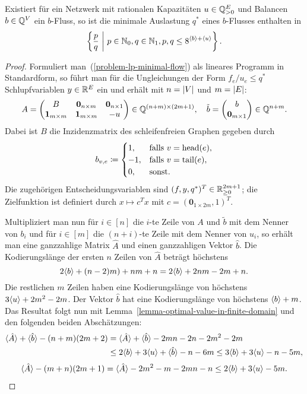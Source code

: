 \begin{corollary}\label{cor-minimal-congestion-limited}
	Existiert für ein Netzwerk mit rationalen Kapazitäten $u\in\mathbb{Q}_{>0}^E$ und Balancen $b\in\mathbb{Q}^V$ ein $b$-Fluss, so ist die minimale Auslastung $q^*$ eines $b$-Flusses enthalten in
	\[
	\left\{ \frac{p}{q} ~\middle|~ p\in\mathbb{N}_0, q\in\mathbb{N}_1, p,q \leq 8^{\langle b\rangle + \langle u\rangle } \right\}.
	\]
\end{corollary}
\begin{proof}
Formuliert man~(\ref{problem-lp-minimal-flow}) als lineares Programm in Standardform, so führt man für die Ungleichungen der Form $f_e/u_e \leq q^*$ Schlupfvariablen $y\in\mathbb{R}^E$ ein und erhält mit $n=\lvert V\rvert$ und $m=\lvert E\rvert$:
\newcommand{\nil}{\mathbf{0}}
\newcommand{\one}{\mathbf{1}}
\[
	A = \begin{pmatrix}
		B & \nil_{n\times m} & \nil_{n\times 1} \\
		\one_{m\times m} & \one_{m\times m} & -u
	\end{pmatrix} \in \Q^{(n+m) \times (2m+1)},~~~
	\tilde{b} = \begin{pmatrix}
		b \\
		\nil_{m\times 1}
	\end{pmatrix} \in \Q^{n+m}.
\]
Dabei ist $B$ die Inzidenzmatrix des schleifenfreien Graphen gegeben durch 
\[ 
	b_{v,e} \coloneq \begin{cases}
		1, & \text{falls $v = \operatorname{head}(e)$}, \\
		-1, & \text{falls $v = \operatorname{tail}(e)$},\\
		0, & \text{sonst.}
	\end{cases}
\]
 Die zugehörigen Entscheidungsvariablen sind $(f, y, q^*)^T\in\mathbb{R}_{\geq 0}^{2m+1}$; die Zielfunktion ist definiert durch $x\mapsto c^T x$ mit $c = (\nil_{1\times 2m}, 1)^T$.
 
Multipliziert man nun für $i\in [n]$ die $i$-te Zeile von $A$ und $\tilde{b}$ mit dem Nenner von $b_i$ und für $i\in [m]$ die $(n+i)$-te Zeile mit dem Nenner von $u_i$, so erhält man eine ganzzahlige Matrix $\hat{A}$ und einen ganzzahligen Vektor $\hat{b}$.
Die Kodierungslänge der ersten $n$ Zeilen von $\hat{A}$ beträgt höchstens \[ 2\langle b\rangle + (n-2)m) + nm + n = 2\langle b\rangle + 2nm -2m + n.
\]
Die restlichen $m$ Zeilen haben eine Kodierungslänge von höchstens $3\langle u\rangle + 2m^2 - 2m$.
Der Vektor $\hat{b}$ hat eine Kodierungslänge von höchstens $\langle b\rangle + m$.
Das Resultat folgt nun mit Lemma~\ref{lemma-optimal-value-in-finite-domain} und den folgenden beiden Abschätzungen:
{\setlength{\abovedisplayskip}{9pt}%
	\setlength{\belowdisplayskip}{0pt}%
\begin{align*}
\langle\hat{A}\rangle + \langle\hat{b}\rangle - (n+m)(2m+2) &= \langle\hat{A}\rangle + \langle\hat{b}\rangle - 2mn - 2n - 2m^2 - 2m\\
&\leq 2 \langle b\rangle + 3\langle u\rangle + \langle\hat{b}\rangle - n - 6m \leq 3\langle b\rangle + 3\langle u\rangle -n-5m,
\end{align*}
\begin{align*}
\langle\hat{A}\rangle - (m+n)(2m + 1) = \langle\hat{A}\rangle - 2m^2 - m - 2mn - n \leq 2\langle b\rangle + 3\langle u\rangle - 5m.
\end{align*}
}
\end{proof}

